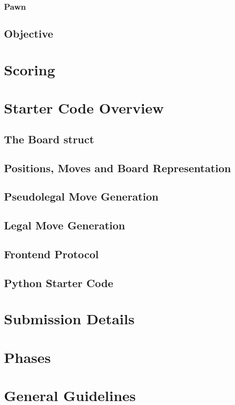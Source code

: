 \documentclass[10pt]{article}
\begin{document}
\subsubsection{Pawn}

\subsection{Objective}

\section{Scoring}

\section{Starter Code Overview}

\subsection{The Board struct}

\subsection{Positions, Moves and Board Representation}

\subsection{Pseudolegal Move Generation}

\subsection{Legal Move Generation}

\subsection{Frontend Protocol}

\subsection{Python Starter Code}

\section{Submission Details}

\section{Phases}

\section{General Guidelines} 
\end{document}
